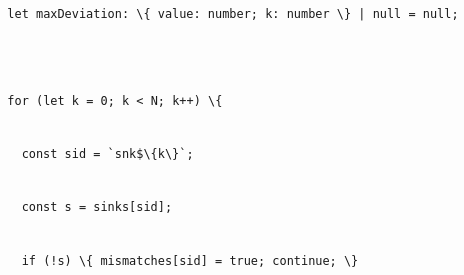 \documentclass[
]{article}
\newcommand{\passthrough}[1]{#1}
\begin{document}
\passthrough{\lstinline!  !}\passthrough{\lstinline!let!}\passthrough{\lstinline! !}\passthrough{\lstinline!maxDeviation!}\passthrough{\lstinline!:!}\passthrough{\lstinline! !}\passthrough{\lstinline!\{!}\passthrough{\lstinline! !}\passthrough{\lstinline!value:!}\passthrough{\lstinline! !}\passthrough{\lstinline!number;!}\passthrough{\lstinline! !}\passthrough{\lstinline!k:!}\passthrough{\lstinline! !}\passthrough{\lstinline!number!}\passthrough{\lstinline! !}\passthrough{\lstinline!\}!}\passthrough{\lstinline! !}\passthrough{\lstinline!|!}\passthrough{\lstinline! !}\passthrough{\lstinline!null!}\passthrough{\lstinline! !}\passthrough{\lstinline!=!}\passthrough{\lstinline! !}\passthrough{\lstinline!null;!}\strut \\
\strut \\
\passthrough{\lstinline!  !}\passthrough{\lstinline!for!}\passthrough{\lstinline! !}\passthrough{\lstinline!(let!}\passthrough{\lstinline! !}\passthrough{\lstinline!k!}\passthrough{\lstinline! !}\passthrough{\lstinline!=!}\passthrough{\lstinline! !}\passthrough{\lstinline!0;!}\passthrough{\lstinline! !}\passthrough{\lstinline!k!}\passthrough{\lstinline! !}\passthrough{\lstinline!<!}\passthrough{\lstinline! !}\passthrough{\lstinline!N;!}\passthrough{\lstinline! !}\passthrough{\lstinline!k++)!}\passthrough{\lstinline! !}\passthrough{\lstinline!\{!}\strut \\
\passthrough{\lstinline!    !}\passthrough{\lstinline!const!}\passthrough{\lstinline! !}\passthrough{\lstinline!sid!}\passthrough{\lstinline! !}\passthrough{\lstinline!=!}\passthrough{\lstinline! !}\passthrough{\lstinline!`!}\passthrough{\lstinline!snk!}\passthrough{\lstinline!$\{k\}`;!}\strut \\
\passthrough{\lstinline!    !}\passthrough{\lstinline!const!}\passthrough{\lstinline! !}\passthrough{\lstinline!s!}\passthrough{\lstinline! !}\passthrough{\lstinline!=!}\passthrough{\lstinline! !}\passthrough{\lstinline!sinks[!}\passthrough{\lstinline!sid!}\passthrough{\lstinline!];!}\strut \\
\passthrough{\lstinline!    !}\passthrough{\lstinline!if!}\passthrough{\lstinline! !}\passthrough{\lstinline"(!s)"}\passthrough{\lstinline! !}\passthrough{\lstinline!\{!}\passthrough{\lstinline! !}\passthrough{\lstinline!mismatches[!}\passthrough{\lstinline!sid!}\passthrough{\lstinline!]!}\passthrough{\lstinline! !}\passthrough{\lstinline!=!}\passthrough{\lstinline! !}\passthrough{\lstinline!true;!}\passthrough{\lstinline! !}\passthrough{\lstinline!continue;!}\passthrough{\lstinline! !}\passthrough{\lstinline!\}!}\strut \\
\end{document}
